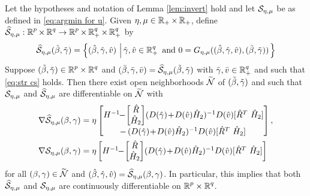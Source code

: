 \begin{theorem}\label{thm:diff sol map}
Let the hypotheses and notation of Lemma \ref{lem:invert} hold and let $\mathcal{S}_{\eta,\mu}$
be as defined in \eqref{eq:argmin for u}. Given ${\eta,\mu}\in\operatorname{\mathbb{R}}_+\times\operatorname{\mathbb{R}}_+$,
define
${\widehat{\mathcal{S}}}_{\eta,\mu}:\operatorname{\mathbb{R}}^p\times\operatorname{\mathbb{R}}^q\rightarrow \operatorname{\mathbb{R}}^p \times\operatorname{\mathbb{R}}^q_+\times\operatorname{\mathbb{R}}^q_+$ by
\begin{equation}\label{eq:hSS}
\hSS_\emu(\tbeta,\tgam)=
\lset{(\hbeta, \hgam,\hv)}{\hgam,\hv\in\R^q_+\ \text{and}\ 
0=G_\emu((\hbeta, \hgam,\hv),(\tbeta,\tgam))}
\end{equation}
Suppose
$(\tilde\beta,{\tilde{\gamma}})\in{\operatorname{\mathbb{R}}^p}\times{\operatorname{\mathbb{R}}^q}$ and  
$({\bar\beta}, {\bar{\gamma}},{\bar v})={\widehat{\mathcal{S}}}_{\eta,\mu}(\tilde\beta,{\tilde{\gamma}})$
with ${\bar{\gamma}},{\bar v}\in\operatorname{\mathbb{R}}_+^q$ and such that \eqref{eq:str cs} holds. Then there
exist open neighborhoods $\widetilde{\operatorname{\mathcal{N}}}$ of $(\tilde\beta,{\tilde{\gamma}})$ and 
such that 
$\mathcal{S}_{\eta,\mu}$ and ${\widehat{\mathcal{S}}}_{\eta,\mu}$ are differentiable on $\widetilde{\operatorname{\mathcal{N}}}$ with
\[
\begin{aligned}
\nabla \hSS_\emu(\beta,\gam)&=\eta
\begin{bmatrix}
H^{-1}\!\!-\!\begin{bmatrix}\hat R\\ \hat H_2\end{bmatrix}\!
(D(\hgam)\!+\!D(\hv)\hat H_2)^{-1}D(\hv)[\hat R^T\ \hat H_2]
\\
\!-\,(D(\hgam)\!+\!D(\hv)\hat H_2)^{-1}D(\hv)[\hat R^T\ \hat H_2]
\end{bmatrix},
\\
\nabla \SS_\emu(\beta,\gam)&=\eta
\begin{bmatrix}
H^{-1}\!\!-\!\begin{bmatrix}\hat R\\ \hat H_2\end{bmatrix}\!
(D(\hgam)\!+\!D(\hv)\hat H_2)^{-1}D(\hv)[\hat R^T\ \hat H_2]
\end{bmatrix}
\end{aligned}
\]
for all $(\beta,\gamma)\in \widetilde{\operatorname{\mathcal{N}}}$ and 
$(\hat{\beta},{\hat{\gamma}},{\hat v})={\widehat{\mathcal{S}}}_{\eta,\mu}(\beta,\gamma)$.
In particular, this implies that both ${\widehat{\mathcal{S}}}_{\eta,\mu}$ and $\mathcal{S}_{\eta,\mu}$
are continuously differentiable on ${\operatorname{\mathbb{R}}^p}\times{\operatorname{\mathbb{R}}^q}$.
\end{theorem}

